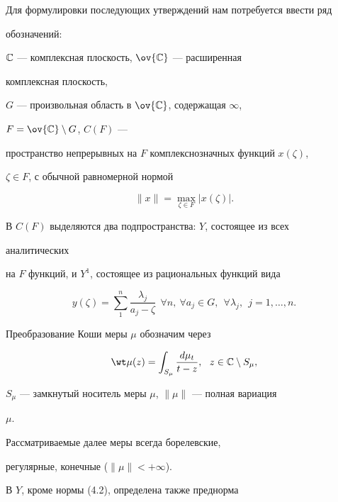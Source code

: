  


Для формулировки последующих утверждений нам потребуется ввести ряд 


обозначений: 


$\Bbb C$ --- комплексная плоскость, $\ov{\Bbb C}$ --- расширенная 


комплексная плоскость, 


$G$ --- произвольная область в $\ov{\Bbb C}$, содержащая $\infty$, 


$F=\ov{\Bbb C}\setminus G$, $C(F)$ --- 


пространство непрерывных на $F$ комплекснозначных функций $x(\zeta)$, 


$\zeta\in F$, с обычной равномерной нормой


\begin{equation} 


\|x\|=\max_{\zeta\in F}|x(\zeta)|. 


\end{equation} 


В $C(F)$ выделяются два подпространства: $Y$, состоящее из всех 


аналитических 


на $F$ функций, и $Y^1$, состоящее из рациональных функций вида 


\begin{equation} 


y(\zeta)=\sum^n_1 \frac{\lambda_j}{a_j-\zeta} 


\ \ \forall n,\ \forall a_j\in G,\ \ \forall \lambda_j, 


\ \ j=1,\dotsc,n. 


\end{equation} 


Преобразование Коши меры $\mu$ обозначим через


\begin{equation} 


\wt\mu(z)=\int_{S_\mu}\frac{d\mu_t}{t-z}, 


\ \ z\in\Bbb C\setminus S_\mu, 


\end{equation} 


$S_\mu$ --- замкнутый носитель меры $\mu$, $\|\mu\|$ --- полная вариация 


$\mu$. 


Рассматриваемые далее меры всегда борелевские, 


регулярные, конечные ($\|\mu\|<+\infty$). 


В $Y$, кроме нормы (4.2), определена также преднорма 



